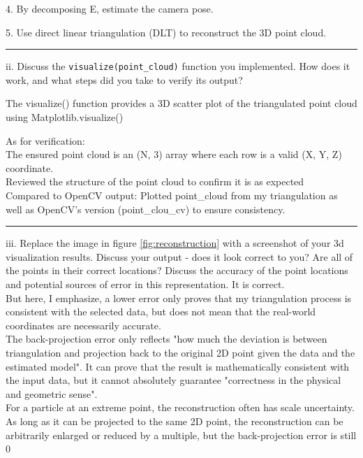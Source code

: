 \documentclass[onecolumn,10pt]{article}
\begin{document}
4. By decomposing E, estimate the camera pose.

5. Use direct linear triangulation (DLT) to reconstruct the 3D point cloud.

\hrule
ii. Discuss the \texttt{visualize(point\_cloud)} function you implemented. How does it work, and what steps did you take to verify its output?

The visualize() function provides a 3D scatter plot of the triangulated point cloud using Matplotlib.visualize()

As for verification:\\
The ensured point cloud is an (N, 3) array where each row is a valid (X, Y, Z) coordinate.\\
Reviewed the structure of the point cloud to confirm it is as expected\\
Compared to OpenCV output: Plotted point\_cloud from my triangulation as well as OpenCV's version (point\_clou\_cv) to ensure consistency.\\

\hrule
iii. Replace the image in figure \ref{fig:reconstruction} with a screenshot of your 3d visualization results. Discuss your output - does it look correct to you? Are all of the points in their correct locations? Discuss the accuracy of the point locations and potential sources of error in this representation. 
It is correct.\\
But here, I emphasize, a lower error only proves that my triangulation process is consistent with the selected data, but does not mean that the real-world coordinates are necessarily accurate.\\
The back-projection error only reflects "how much the deviation is between triangulation and projection back to the original 2D point given the data and the estimated model". It can prove that the result is mathematically consistent with the input data, but it cannot absolutely guarantee "correctness in the physical and geometric sense". \\
For a particle at an extreme point, the reconstruction often has scale uncertainty. As long as it can be projected to the same 2D point, the reconstruction can be arbitrarily enlarged or reduced by a multiple, but the back-projection error is still 0\\
\end{document}
